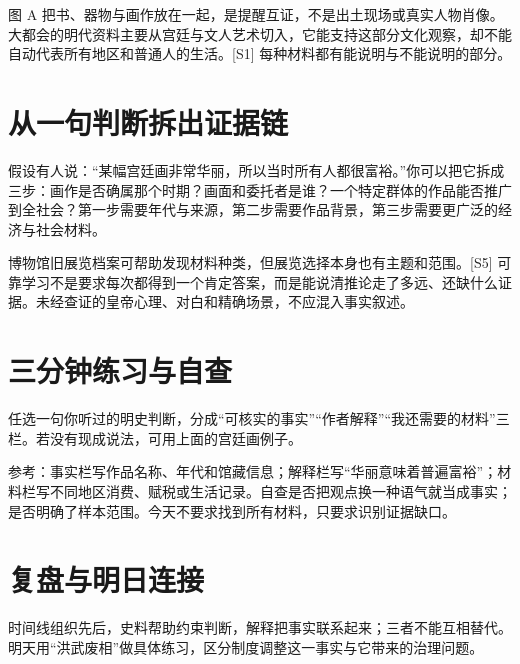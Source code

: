 \documentclass[11pt]{article}
\newcommand{\Needspace}[1]{\par\ifdim\dimexpr\pagegoal-\pagetotal\relax<#1\relax\newpage\fi}
\begin{document}
图 A 把书、器物与画作放在一起，是提醒互证，不是出土现场或真实人物肖像。大都会的明代资料主要从宫廷与文人艺术切入，它能支持这部分文化观察，却不能自动代表所有地区和普通人的生活。[S1] 每种材料都有能说明与不能说明的部分。

\Needspace{5\baselineskip}\section*{从一句判断拆出证据链}

假设有人说：“某幅宫廷画非常华丽，所以当时所有人都很富裕。”你可以把它拆成三步：画作是否确属那个时期？画面和委托者是谁？一个特定群体的作品能否推广到全社会？第一步需要年代与来源，第二步需要作品背景，第三步需要更广泛的经济与社会材料。

博物馆旧展览档案可帮助发现材料种类，但展览选择本身也有主题和范围。[S5] 可靠学习不是要求每次都得到一个肯定答案，而是能说清推论走了多远、还缺什么证据。未经查证的皇帝心理、对白和精确场景，不应混入事实叙述。

\Needspace{5\baselineskip}\section*{三分钟练习与自查}

任选一句你听过的明史判断，分成“可核实的事实”“作者解释”“我还需要的材料”三栏。若没有现成说法，可用上面的宫廷画例子。

参考：事实栏写作品名称、年代和馆藏信息；解释栏写“华丽意味着普遍富裕”；材料栏写不同地区消费、赋税或生活记录。自查是否把观点换一种语气就当成事实；是否明确了样本范围。今天不要求找到所有材料，只要求识别证据缺口。

\Needspace{5\baselineskip}\section*{复盘与明日连接}

时间线组织先后，史料帮助约束判断，解释把事实联系起来；三者不能互相替代。明天用“洪武废相”做具体练习，区分制度调整这一事实与它带来的治理问题。
\end{document}
